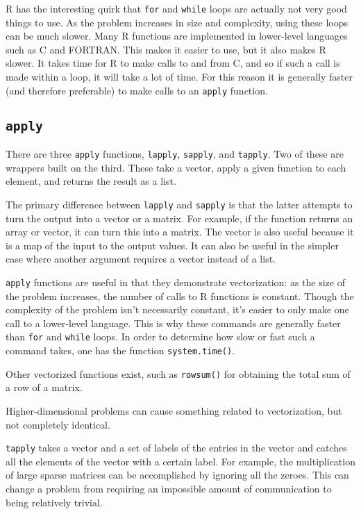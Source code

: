 R has the interesting quirk that \texttt{for} and \texttt{while} loops are actually not very good things to use. As the problem increases in size and complexity, using these loops can be much slower. Many R functions are implemented in lower-level languages such as C and FORTRAN. This makes it easier to use, but it also makes R slower. It takes time for R to make calls to and from C, and so if such a call is made within a loop, it will take a lot of time. For this reason it is generally faster (and therefore preferable) to make calls to an \texttt{apply} function.
\subsection{\texttt{apply}}
There are three \texttt{apply} functions, \texttt{lapply}, \texttt{sapply}, and \texttt{tapply}. Two of these are wrappers built on the third. These take a vector, apply a given function to each element, and returns the result as a list.

The primary difference between \texttt{lapply} and \texttt{sapply} is that the latter attempts to turn the output into a vector or a matrix. For example, if the function returns an array or vector, it can turn this into a matrix. The vector is also useful because it is a map of the input to the output values. It can also be useful in the simpler case where another argument requires a vector instead of a list.

\texttt{apply} functions are useful in that they demonstrate vectorization: as the size of the problem increases, the number of calls to R functions is constant. Though the complexity of the problem isn't necessarily constant, it's easier to only make one call to a lower-level language. This is why these commands are generally faster than \texttt{for} and \texttt{while} loops. In order to determine how slow or fast such a command takes, one has the function \texttt{system.time()}.

Other vectorized functions exist, such as \texttt{rowsum()} for obtaining the total sum of a row of a matrix.

Higher-dimensional problems can cause something related to vectorization, but not completely identical.

\texttt{tapply} takes a vector and a set of labels of the entries in the vector and catches all the elements of the vector with a certain label. For example, the multiplication of large sparse matrices can be accomplished by ignoring all the zeroes. This can change a problem from requiring an impossible amount of communication to being relatively trivial.
